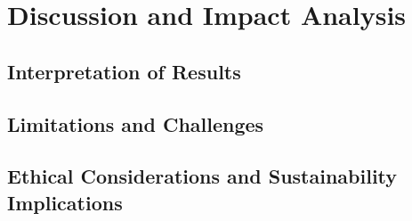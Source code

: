 \chapter{Discussion and Impact Analysis}
\section{Interpretation of Results}
\section{Limitations and Challenges}
\section{Ethical Considerations and Sustainability Implications}